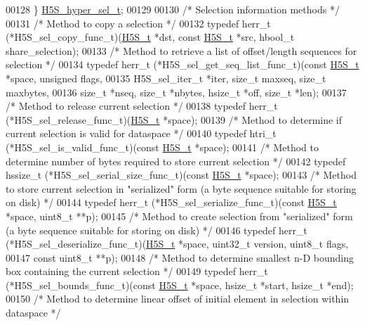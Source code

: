 \begin{DoxyCode}
00128 \} \hyperlink{struct_h5_s__hyper__sel__t}{H5S\_hyper\_sel\_t};
00129 
00130 \textcolor{comment}{/* Selection information methods */}
00131 \textcolor{comment}{/* Method to copy a selection */}
00132 \textcolor{keyword}{typedef} herr\_t (*H5S\_sel\_copy\_func\_t)(\hyperlink{struct_h5_s__t}{H5S\_t} *dst, \textcolor{keyword}{const} \hyperlink{struct_h5_s__t}{H5S\_t} *src, hbool\_t share\_selection);
00133 \textcolor{comment}{/* Method to retrieve a list of offset/length sequences for selection */}
00134 \textcolor{keyword}{typedef} herr\_t (*H5S\_sel\_get\_seq\_list\_func\_t)(\textcolor{keyword}{const} \hyperlink{struct_h5_s__t}{H5S\_t} *space, \textcolor{keywordtype}{unsigned} flags,
00135     H5S\_sel\_iter\_t *iter, \textcolor{keywordtype}{size\_t} maxseq, \textcolor{keywordtype}{size\_t} maxbytes,
00136     \textcolor{keywordtype}{size\_t} *nseq, \textcolor{keywordtype}{size\_t} *nbytes, hsize\_t *off, \textcolor{keywordtype}{size\_t} *len);
00137 \textcolor{comment}{/* Method to release current selection */}
00138 \textcolor{keyword}{typedef} herr\_t (*H5S\_sel\_release\_func\_t)(\hyperlink{struct_h5_s__t}{H5S\_t} *space);
00139 \textcolor{comment}{/* Method to determine if current selection is valid for dataspace */}
00140 \textcolor{keyword}{typedef} htri\_t (*H5S\_sel\_is\_valid\_func\_t)(\textcolor{keyword}{const} \hyperlink{struct_h5_s__t}{H5S\_t} *space);
00141 \textcolor{comment}{/* Method to determine number of bytes required to store current selection */}
00142 \textcolor{keyword}{typedef} hssize\_t (*H5S\_sel\_serial\_size\_func\_t)(\textcolor{keyword}{const} \hyperlink{struct_h5_s__t}{H5S\_t} *space);
00143 \textcolor{comment}{/* Method to store current selection in "serialized" form (a byte sequence suitable for storing on disk) */}
00144 \textcolor{keyword}{typedef} herr\_t (*H5S\_sel\_serialize\_func\_t)(\textcolor{keyword}{const} \hyperlink{struct_h5_s__t}{H5S\_t} *space, uint8\_t **p);
00145 \textcolor{comment}{/* Method to create selection from "serialized" form (a byte sequence suitable for storing on disk) */}
00146 \textcolor{keyword}{typedef} herr\_t (*H5S\_sel\_deserialize\_func\_t)(\hyperlink{struct_h5_s__t}{H5S\_t} *space, uint32\_t version, uint8\_t flags,
00147     \textcolor{keyword}{const} uint8\_t **p);
00148 \textcolor{comment}{/* Method to determine smallest n-D bounding box containing the current selection */}
00149 \textcolor{keyword}{typedef} herr\_t (*H5S\_sel\_bounds\_func\_t)(\textcolor{keyword}{const} \hyperlink{struct_h5_s__t}{H5S\_t} *space, hsize\_t *start, hsize\_t *end);
00150 \textcolor{comment}{/* Method to determine linear offset of initial element in selection within dataspace */}

\end{DoxyCode}
